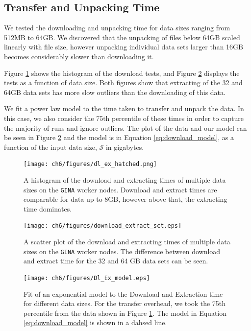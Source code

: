 \subsection{Transfer and Unpacking Time}\label{sec:ch6_results_dl}

We tested the downloading and unpacking time for data sizes ranging from 512MB to 64GB. We discovered that the unpacking of files below 64GB scaled linearly with file size, however unpacking individual data sets larger than 16GB becomes considerably slower than downloading it. 

Figure \ref{fig:ch6_dl_hist} shows the histogram of the download tests, and Figure \ref{fig:ch6_dl_plot} displays the tests as a function of data size. Both figures show that extracting of the 32 and 64GB data sets has more slow outliers than the downloading of this data. 

We fit a power law model to the time taken to transfer and unpack the data. In this case, we also consider the 75th percentile of these times in order to capture the majority of runs and ignore outliers. The plot of the data and our model can be seen in Figure \ref{fig:ch6_dl_plot} and the model is in Equation \ref{eq:download_model}, as a function of the input data size,
$\mathcal{S} $ in gigabytes.

\begin{figure}
    \texttt{[image: ch6/figures/dl\_ex\_hatched.png]}
      \caption{A histogram of the download and extracting times of multiple data sizes on the \texttt{GINA} worker nodes. Download and extract times are comparable for data up to 8GB, however above that, the extracting time dominates.  }
	\label{fig:ch6_dl_hist}
\end{figure}

\begin{figure}
    \texttt{[image: ch6/figures/download\_extract\_sct.eps]}
      \caption{A scatter plot of the download and extracting times of multiple data sizes on the \texttt{GINA} worker nodes. The difference between download and extract time for the 32 and 64 GB data sets can be seen.  }
	\label{fig:ch6_dl_plot}
\end{figure}

\begin{figure}
    \texttt{[image: ch6/figures/Dl\_Ex\_model.eps]}
      \caption{Fit of an exponential model to the Download and Extraction time for different data sizes. For the transfer overhead, we took the 75th percentile from the data shown in Figure \ref{fig:ch6_dl_hist}. The model in Equation \ref{eq:download_model} is shown in a dahsed line. }
	\label{fig:ch6_dl_ex_model}
\end{figure}


